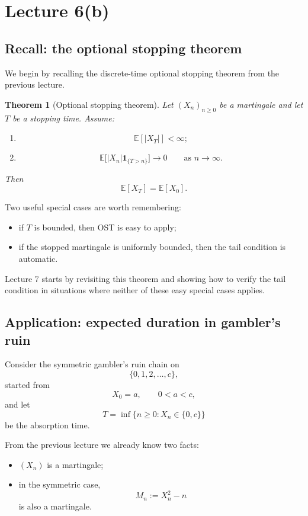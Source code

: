 \documentclass[11pt]{article}
\newtheorem{theorem}{Theorem}[section]
\theoremstyle{definition}
\begin{document}
\clearpage

\section{Lecture 6(b)}

\subsection{Recall: the optional stopping theorem}

We begin by recalling the discrete-time optional stopping theorem from the previous lecture.

\begin{theorem}[Optional stopping theorem]
Let \((X_n)_{n\ge 0}\) be a martingale and let \(T\) be a stopping time. Assume:
\begin{enumerate}[label=(\roman*)]
    \item
    \[
    \mathbb E[|X_T|]<\infty;
    \]
    \item
    \[
    \mathbb E\bigl[|X_n|\mathbf 1_{\{T>n\}}\bigr]\to 0
    \qquad \text{as } n\to\infty.
    \]
\end{enumerate}
Then
\[
\mathbb E[X_T]=\mathbb E[X_0].
\]
\end{theorem}

Two useful special cases are worth remembering:
\begin{itemize}[leftmargin=2em]
    \item if \(T\) is bounded, then OST is easy to apply;
    \item if the stopped martingale is uniformly bounded, then the tail condition is automatic.
\end{itemize}

Lecture 7 starts by revisiting this theorem and showing how to verify the tail condition in situations where neither of these easy special cases applies.

\subsection{Application: expected duration in gambler's ruin}

Consider the symmetric gambler's ruin chain on
\[
\{0,1,2,\dots,c\},
\]
started from
\[
X_0=a, \qquad 0<a<c,
\]
and let
\[
T=\inf\{n\ge 0:X_n\in\{0,c\}\}
\]
be the absorption time.

From the previous lecture we already know two facts:
\begin{itemize}[leftmargin=2em]
    \item \((X_n)\) is a martingale;
    \item in the symmetric case,
    \[
    M_n:=X_n^2-n
    \]
    is also a martingale.
\end{itemize}
\end{document}
